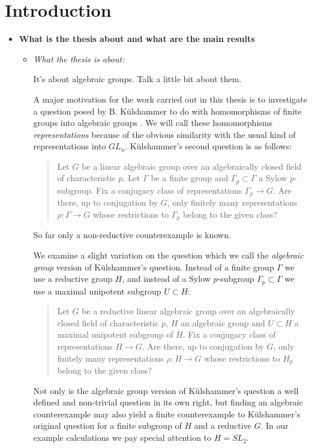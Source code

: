 
\chapter{Introduction}
\label{Chapter1}

\begin{itemize}
	\item[] \textbf{What is the thesis about and what are the main results}
	\begin{itemize}
		\item \emph{What the thesis is about:}
		
		
		It's about algebraic groups. Talk a little bit about them.
		
		A major motivation for the work carried out in this thesis is to investigate a question posed by B. K\"ulshammer to do with homomorphisms of finite groups into algebraic groups \cite{weil1964remarks}. We will call these homomorphisms \emph{representations} because of the obvious similarity with the usual kind of representations into $GL_n$. K\"ulshammer's second question is as follows:
		\begin{quote}
		Let $G$ be a linear algebraic group over an algebraically closed field of characteristic $p$. Let $\Gamma$ be a finite group and $\Gamma_p\subset\Gamma$ a Sylow $p$-subgroup. Fix a conjugacy class of representations $\Gamma_p\rightarrow G$. Are there, up to conjugation by $G$, only finitely many representations $\rho:\Gamma\rightarrow G$ whose restrictions to $\Gamma_p$ belong to the given class?
		\end{quote}
		
		
		So far only a non-reductive counterexample\cite{weil1964remarks} is known. 
		
		
		We examine a slight variation on the question which we call the \emph{algebraic group} version of K\"ulshammer's question. Instead of a finite group $\Gamma$ we use a reductive group $H$, and instead of a Sylow $p$-subgroup $\Gamma_p \subset \Gamma$ we use a maximal unipotent subgroup $U \subset H$:
		\begin{quote}
			Let $G$ be a reductive linear algebraic group over an algebraically closed field of characteristic $p$, $H$ an algebraic group and $U \subset H$ a maximal unipotent subgroup of $H$. Fix a conjugacy class of representations $H\rightarrow G$. Are there, up to conjugation by $G$, only finitely many representations $\rho:H\rightarrow G$ whose restrictions to $H_p$ belong to the given class?
		\end{quote}
		Not only is the algebraic group version of K\"ulshammer's question a well defined and non-trivial question in its own right, but finding an algebraic counterexample may also yield a finite counterexample to K\"ulshammer's original question for a finite subgroup of $H$ and a reductive $G$. In our example calculations we pay special attention to $H = SL_2$.
		

\end{itemize}
\end{itemize}
